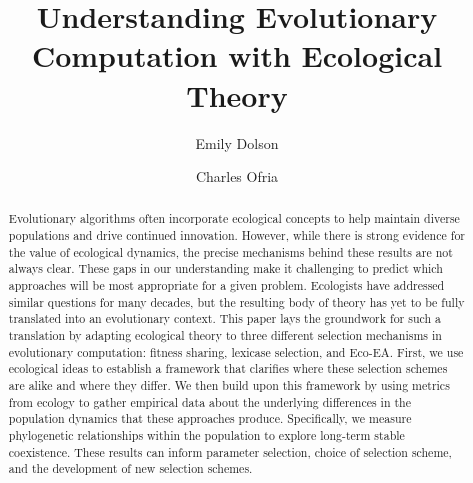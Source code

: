 \documentclass[sigconf]{acmart}
\begin{document}
\title{Understanding Evolutionary Computation with Ecological Theory}
\subtitle{}


\author{Emily Dolson}
\authornote{}

\author{Charles Ofria}
\authornote{}


\renewcommand{\shortauthors}{E. Dolson and C. Ofria}


\begin{abstract}
Evolutionary algorithms often incorporate ecological concepts to help maintain diverse populations and drive continued innovation. However, while there is strong evidence for the value of ecological dynamics, the precise mechanisms behind these results are not always clear. These gaps in our understanding make it challenging to predict which approaches will be most appropriate for a given problem. Ecologists have addressed similar questions for many decades, but the resulting body of theory has yet to be fully translated into an evolutionary context. This paper lays the groundwork for such a translation by adapting ecological theory to three different selection mechanisms in evolutionary computation: fitness sharing, lexicase selection, and Eco-EA. First, we use ecological ideas to establish a framework that clarifies where these selection schemes are alike and where they differ. We then build upon this framework by using metrics from ecology to gather empirical data about the underlying differences in the population dynamics that these approaches produce. Specifically, we measure phylogenetic relationships within the population to explore long-term stable coexistence. These results can inform parameter selection, choice of selection scheme, and the development of new selection schemes.

\end{abstract}
\end{document}
